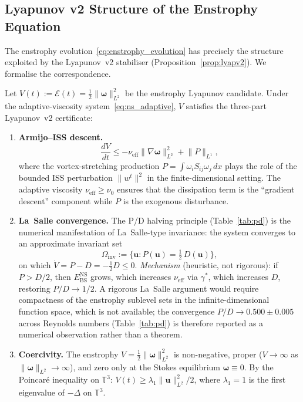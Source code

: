 \documentclass[final]{siamltex}
\newcommand{\T}{\mathbb{T}}
\newcommand{\norm}[1]{\lVert #1 \rVert}
\providecommand{\grad}{\nabla}
\newcommand{\Ebs}{E_{\mathrm{BS}}}
\begin{document}
\subsection{Lyapunov v2 Structure of the Enstrophy
Equation}\label{sec:ns:lyapv2}

The enstrophy evolution~\eqref{eq:enstrophy_evolution} has
precisely the structure exploited by the Lyapunov~v2 stabiliser
(Proposition~\ref{prop:lyapv2}).  We formalise the correspondence.

\begin{proposition}%
\label{prop:ns_lyapv2}
Let $V(t) := \mathcal{E}(t) = \tfrac{1}{2}\norm{\bm{\omega}}_{L^2}^2$
be the enstrophy Lyapunov candidate.  Under the adaptive-viscosity
system~\eqref{eq:ns_adaptive}, $V$ satisfies the three-part
Lyapunov~v2 certificate:
\begin{enumerate}
\item[\textup{(i)}] \textbf{Armijo--ISS descent.}
  \begin{equation}\label{eq:ns_armijo}
    \frac{dV}{dt} \le -\nu_{\mathrm{eff}}\norm{\grad\bm{\omega}}_{L^2}^2
    + \norm{P}_{L^1},
  \end{equation}
  where the vortex-stretching production $P = \int\omega_i S_{ij}
  \omega_j\,dx$ plays the role of the bounded ISS perturbation
  $\norm{w^t}^2$ in the finite-dimensional setting.  The adaptive
  viscosity $\nu_{\mathrm{eff}} \ge \nu_0$ ensures that the
  dissipation term is the ``gradient descent'' component while $P$
  is the exogenous disturbance.

\item[\textup{(ii)}] \textbf{La~Salle convergence.}  The P/D
  halving principle (Table~\ref{tab:pd}) is the numerical
  manifestation of La~Salle-type invariance: the system converges
  to an approximate invariant set
  \[
    \Omega_{\mathrm{inv}} := \bigl\{\bm{u} :
    P(\bm{u}) = \tfrac{1}{2}\,D(\bm{u})\bigr\},
  \]
  on which $\dot{V} = P - D = -\tfrac{1}{2}D \le 0$.
  \emph{Mechanism} (heuristic, not rigorous): if $P > D/2$,
  then $\Ebs^{\mathrm{NS}}$ grows, which increases
  $\nu_{\mathrm{eff}}$ via $\gamma^*$, which increases $D$,
  restoring $P/D \to 1/2$.  A rigorous La~Salle argument would
  require compactness of the enstrophy sublevel sets in the
  infinite-dimensional function space, which is not available;
  the convergence $P/D \to 0.500 \pm 0.005$ across Reynolds
  numbers (Table~\ref{tab:pd}) is therefore reported as a
  numerical observation rather than a theorem.

\item[\textup{(iii)}] \textbf{Coercivity.}  The enstrophy
  $V = \tfrac{1}{2}\norm{\bm{\omega}}_{L^2}^2$ is non-negative,
  proper ($V \to \infty$ as $\norm{\bm{\omega}}_{L^2} \to \infty$),
  and zero only at the Stokes equilibrium $\bm{\omega} \equiv 0$.
  By the Poincar\'e inequality on $\T^3$:
  $V(t) \ge \lambda_1\norm{\bm{u}}_{L^2}^2 / 2$,
  where $\lambda_1 = 1$ is the first eigenvalue of $-\Delta$ on
  $\T^3$.
\end{enumerate}
\end{proposition}
\end{document}
